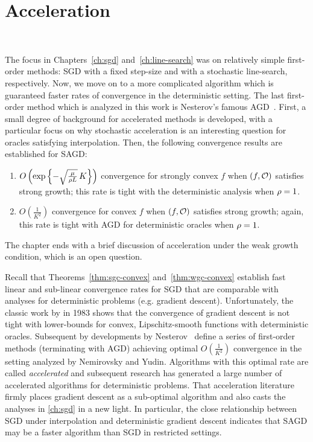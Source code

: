 
\chapter{Acceleration}~\label{ch:acceleration}

The focus in Chapters~\ref{ch:sgd} and~\ref{ch:line-search} was on relatively simple first-order methods: \ac{SGD} with a fixed step-size and with a stochastic line-search, respectively.
Now, we move on to a more complicated algorithm which is guaranteed faster rates of convergence in the deterministic setting.
The last first-order method which is analyzed in this work is Nesterov's famous \ac{AGD}~\cite[Eq. 2.2.20]{nesterov2004lectures}.
First, a small degree of background for accelerated methods is developed, with a particular focus on why stochastic acceleration is an interesting question for oracles satisfying interpolation.
Then, the following convergence results are established for \ac{SAGD}:
\begin{enumerate}
    \item \( O\rbr{\exp\cbr{- \sqrt{\frac{\mu}{\sgc L}} \, K}} \) convergence for strongly convex \( f \) when \( \rbr{f, \oracle{}} \) satisfies strong growth; this rate is tight with the deterministic analysis when \( \sgc = 1 \).
    \item \( O(\frac{1}{K^2}) \)  convergence for convex \( f \) when \( \rbr{f, \oracle{}} \) satisfies strong growth; again, this rate is tight with \ac{AGD} for deterministic oracles when \( \sgc = 1 \).
\end{enumerate}
The chapter ends with a brief discussion of acceleration under the weak growth condition, which is an open question.

Recall that Theorems~\ref{thm:sgc-convex} and~\ref{thm:wgc-convex} establish fast linear and sub-linear convergence rates for \ac{SGD} that are comparable with analyses for deterministic problems (e.g. gradient descent).
Unfortunately, the classic work by \citet{nemirovsky1983problem} in 1983 shows that the convergence of gradient descent is not tight with lower-bounds for convex, Lipschitz-smooth functions with deterministic oracles. 
Subsequent by developments by Nesterov~\citep{nesterov1983method, nemirovsky1985optimal, nesterov1988approach} define a series of first-order methods (terminating with \ac{AGD}) achieving optimal \( O(\frac{1}{K^2}) \) convergence in the setting analyzed by Nemirovsky and Yudin. 
Algorithms with this optimal rate are called \emph{accelerated} and subsequent research has generated a large number of accelerated algorithms for deterministic problems.
That acceleration literature firmly places gradient descent as a sub-optimal algorithm and also casts the analyses in \autoref{ch:sgd} in a new light.
In particular, the close relationship between \ac{SGD} under interpolation and deterministic gradient descent indicates that \ac{SAGD} may be a faster algorithm than \ac{SGD} in restricted settings. 

